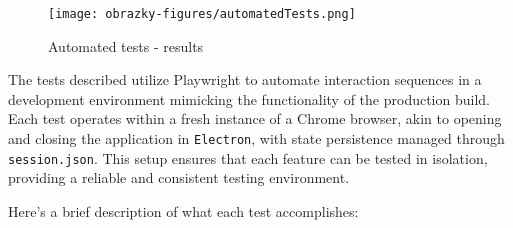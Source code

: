 \begin{figure}[ht]
    \centering
    \texttt{[image: obrazky-figures/automatedTests.png]}
    \caption{Automated tests - results}
    \label{fig:compatibility:results}
\end{figure}

The tests described utilize Playwright to automate interaction sequences in a development environment mimicking the functionality of the production build. Each test operates within a fresh instance of a Chrome browser, akin to opening and closing the application in \texttt{Electron}, with state persistence managed through \texttt{session.json}. This setup ensures that each feature can be tested in isolation, providing a reliable and consistent testing environment.

Here's a brief description of what each test accomplishes:
